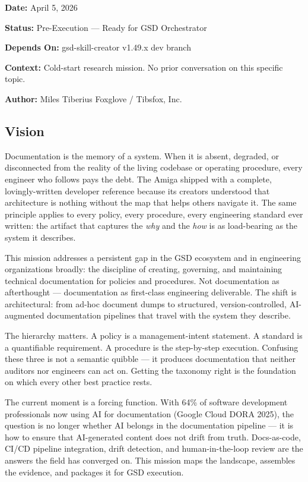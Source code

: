\documentclass[11pt,letterpaper]{article}
\newcommand{\metafield}[2]{\textbf{\sffamily #1} #2\par}
\begin{document}
\metafield{Date:}{April 5, 2026}
\metafield{Status:}{Pre-Execution --- Ready for GSD Orchestrator}
\metafield{Depends On:}{gsd-skill-creator v1.49.x dev branch}
\metafield{Context:}{Cold-start research mission. No prior conversation on this specific topic.}
\metafield{Author:}{Miles Tiberius Foxglove / Tibsfox, Inc.}

\subsection{Vision}

Documentation is the memory of a system. When it is absent, degraded, or disconnected from the reality of the living codebase or operating procedure, every engineer who follows pays the debt. The Amiga shipped with a complete, lovingly-written developer reference because its creators understood that architecture is nothing without the map that helps others navigate it. The same principle applies to every policy, every procedure, every engineering standard ever written: the artifact that captures the \emph{why} and the \emph{how} is as load-bearing as the system it describes.

This mission addresses a persistent gap in the GSD ecosystem and in engineering organizations broadly: the discipline of creating, governing, and maintaining technical documentation for policies and procedures. Not documentation as afterthought --- documentation as first-class engineering deliverable. The shift is architectural: from ad-hoc document dumps to structured, version-controlled, AI-augmented documentation pipelines that travel with the system they describe.

The hierarchy matters. A policy is a management-intent statement. A standard is a quantifiable requirement. A procedure is the step-by-step execution. Confusing these three is not a semantic quibble --- it produces documentation that neither auditors nor engineers can act on. Getting the taxonomy right is the foundation on which every other best practice rests.

The current moment is a forcing function. With 64\% of software development professionals now using AI for documentation (Google Cloud DORA 2025), the question is no longer whether AI belongs in the documentation pipeline --- it is how to ensure that AI-generated content does not drift from truth. Docs-as-code, CI/CD pipeline integration, drift detection, and human-in-the-loop review are the answers the field has converged on. This mission maps the landscape, assembles the evidence, and packages it for GSD execution.
\end{document}
